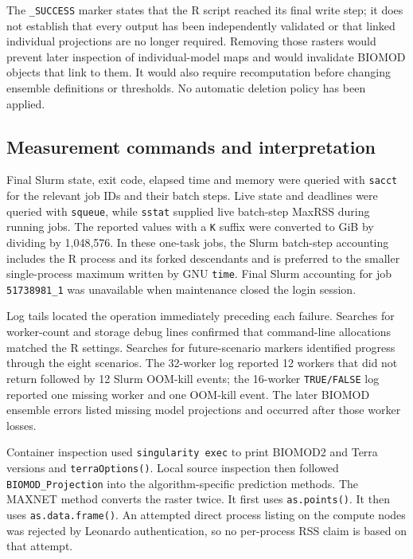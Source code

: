 The \texttt{\_SUCCESS} marker states that the R script reached its final write step; it does not establish that every output has been independently validated or that linked individual projections are no longer required. Removing those rasters would prevent later inspection of individual-model maps and would invalidate BIOMOD objects that link to them. It would also require recomputation before changing ensemble definitions or thresholds. No automatic deletion policy has been applied.

\subsection{Measurement commands and interpretation}

Final Slurm state, exit code, elapsed time and memory were queried with \texttt{sacct} for the relevant job IDs and their batch steps. Live state and deadlines were queried with \texttt{squeue}, while \texttt{sstat} supplied live batch-step MaxRSS during running jobs. The reported values with a \texttt{K} suffix were converted to GiB by dividing by 1,048,576. In these one-task jobs, the Slurm batch-step accounting includes the R process and its forked descendants and is preferred to the smaller single-process maximum written by GNU \texttt{time}. Final Slurm accounting for job \texttt{51738981\_1} was unavailable when maintenance closed the login session.

Log tails located the operation immediately preceding each failure. Searches for worker-count and storage debug lines confirmed that command-line allocations matched the R settings. Searches for future-scenario markers identified progress through the eight scenarios. The 32-worker log reported 12 workers that did not return followed by 12 Slurm OOM-kill events; the 16-worker \texttt{TRUE/FALSE} log reported one missing worker and one OOM-kill event. The later BIOMOD ensemble errors listed missing model projections and occurred after those worker losses.

Container inspection used \texttt{singularity exec} to print BIOMOD2 and Terra versions and \texttt{terraOptions()}. Local source inspection then followed \texttt{BIOMOD\_Projection} into the algorithm-specific prediction methods. The MAXNET method converts the raster twice. It first uses \texttt{as.points()}. It then uses \texttt{as.data.frame()}. An attempted direct process listing on the compute nodes was rejected by Leonardo authentication, so no per-process RSS claim is based on that attempt.

